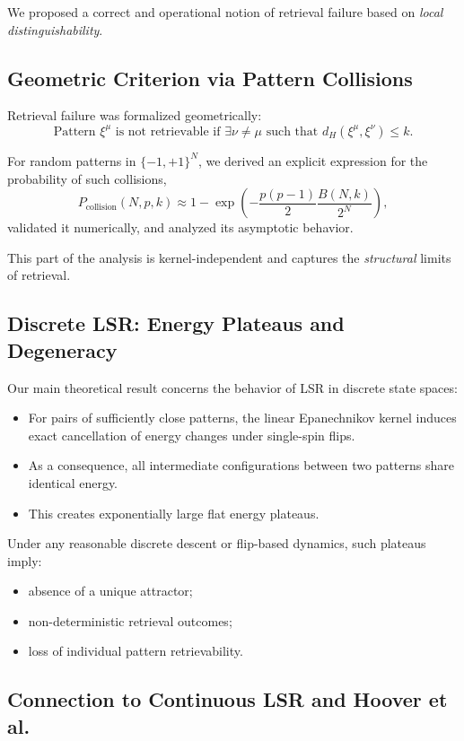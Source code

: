 \documentclass[11pt,a4paper]{article}
\begin{document}
We proposed a correct and operational notion of retrieval failure based on \emph{local distinguishability}.

\subsection{Geometric Criterion via Pattern Collisions}

Retrieval failure was formalized geometrically:
\[
\text{Pattern } \xi^\mu \text{ is not retrievable if } \exists \nu\neq\mu \text{ such that } d_H(\xi^\mu,\xi^\nu)\le k.
\]

For random patterns in $\{-1,+1\}^N$, we derived an explicit expression for the probability of such collisions,
\[
P_{\text{collision}}(N,p,k) \approx 1 - \exp\!\left(-\frac{p(p-1)}{2}\frac{B(N,k)}{2^N}\right),
\]
validated it numerically, and analyzed its asymptotic behavior.

This part of the analysis is kernel-independent and captures the \emph{structural} limits of retrieval.

\subsection{Discrete LSR: Energy Plateaus and Degeneracy}

Our main theoretical result concerns the behavior of LSR in discrete state spaces:
\begin{itemize}
    \item For pairs of sufficiently close patterns, the linear Epanechnikov kernel induces exact cancellation of energy changes under single-spin flips.
    \item As a consequence, all intermediate configurations between two patterns share identical energy.
    \item This creates exponentially large flat energy plateaus.
\end{itemize}

Under any reasonable discrete descent or flip-based dynamics, such plateaus imply:
\begin{itemize}
    \item absence of a unique attractor;
    \item non-deterministic retrieval outcomes;
    \item loss of individual pattern retrievability.
\end{itemize}

\subsection{Connection to Continuous LSR and Hoover et al.}
\end{document}
